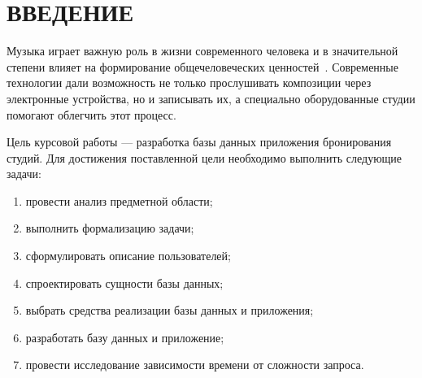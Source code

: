 \chapter*{ВВЕДЕНИЕ}
Музыка играет важную роль в жизни современного человека и в значительной степени влияет на формирование общечеловеческих ценностей~\cite{music_for_youth}.
Современные технологии дали возможность не только прослушивать композиции через электронные устройства, но и записывать их, а специально оборудованные студии помогают облегчить этот процесс.

Цель курсовой работы --- разработка базы данных приложения бронирования студий.
Для достижения поставленной цели необходимо выполнить следующие задачи:

\begin{enumerate}
	\item провести анализ предметной области;
	\item выполнить формализацию задачи;
	\item сформулировать описание пользователей;
	\item спроектировать сущности базы данных;
	\item выбрать средства реализации базы данных и приложения;
	\item разработать базу данных и приложение;
	\item провести исследование зависимости времени от сложности запроса.
\end{enumerate}